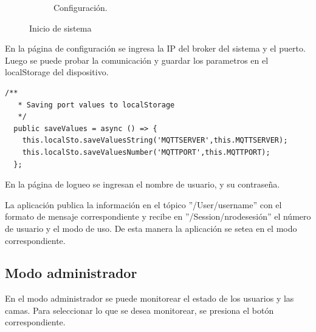 \begin{figure}[!htpb]
\begin{subfigure}[b]{0.3\textwidth}
         \caption{Configuración.}
         \label{fig_0:3_de_3}
     \end{subfigure}
        \caption{Inicio de sistema}
        \label{fig:Pantalla inicial, configuración y acceso de la aplicación.}
\end{figure}

En la página de configuración se ingresa la IP del broker del sistema y el puerto. Luego se puede probar la comunicación y guardar los parametros en el localStorage del dispositivo.

\begin{lstlisting}[label=cod:LocalStorage,caption=  Funciones del servicio que guardan en el localStorage.]
  /**
   * Saving port values to localStorage
   */
  public saveValues = async () => {     
    this.localSto.saveValuesString('MQTTSERVER',this.MQTTSERVER);
    this.localSto.saveValuesNumber('MQTTPORT',this.MQTTPORT);
  };
\end{lstlisting}

En la página de logueo se ingresan el nombre de usuario, y su contraseña.

La aplicación publica la información en el tópico ''/User/username'' con el formato de mensaje correspondiente y recibe en ''/Session/nrodesesión'' el número de usuario y el modo de uso. De esta manera la aplicación se setea en el modo correspondiente.



\subsection{Modo administrador}
En el modo administrador se puede monitorear el estado de los usuarios y las camas. Para seleccionar lo que se desea monitorear, se presiona el botón correspondiente.


